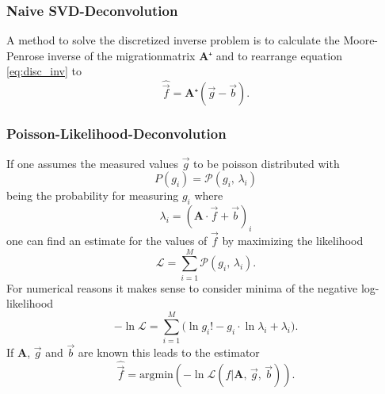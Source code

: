 \subsubsection{Naive SVD-Deconvolution}

A method to solve the discretized inverse problem is to calculate the Moore-Penrose inverse of the migrationmatrix $\textbf{A}⁺$ and to rearrange 
equation \eqref{eq:disc_inv} to 
\begin{equation}
    \hat{\vec{f}} = \textbf{A}⁺ ( \vec{g} - \vec{b} ) .
\end{equation}

\subsubsection{Poisson-Likelihood-Deconvolution}
If one assumes the measured values $\vec{g}$ to be poisson distributed with 
\begin{equation}
    P(g_i) = \mathcal{P}(g_i , \, \lambda_i)
\end{equation}
being the probability for measuring $g_i$ where 
\begin{equation}
    \lambda_i = (\textbf{A} \cdot \vec {f} + \vec{b})_i 
\end{equation}
one can find an estimate for the values of $\vec{f}$ by maximizing the likelihood
\begin{equation}
    \mathcal{L} = \sum_{i=1}^M \mathcal{P}(g_i, \, \lambda_i) . 
\end{equation}
For numerical reasons it makes sense to consider minima of the negative log-likelihood 
\begin{equation}
    - \ln \mathcal{L} = \sum_{i=1}^M \biggl( \ln g_i! - g_i \cdot \ln \lambda_i + \lambda_i \biggr) . 
\end{equation}
If $\textbf{A}$, $\vec{g}$ and $\vec{b}$ are known this leads to the estimator 
\begin{equation}
    \hat{ \vec{f}} = \text{argmin} ( - \ln \mathcal{L} (f | \textbf{A}, \, \vec{g}, \, \vec{b})).
\end{equation}

